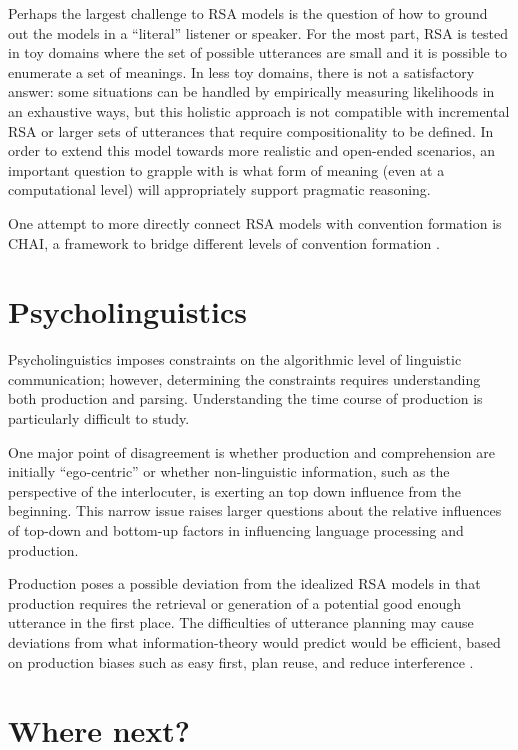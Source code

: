 \documentclass[]{article}
\begin{document}
Perhaps the largest challenge to RSA models is the question of how to ground out the models in a ``literal'' listener or speaker. For the most part, RSA is tested in toy domains where the set of possible utterances are small and it is possible to enumerate a set of meanings. In less toy domains, there is not a satisfactory answer: some situations can be handled by empirically measuring likelihoods in an exhaustive ways, but this holistic approach is not compatible with incremental RSA or larger sets of utterances that require compositionality to be defined. In order to extend this model towards more realistic and open-ended scenarios, an important question to grapple with is what form of meaning (even at a computational level) will appropriately support pragmatic reasoning. 

One attempt to more directly connect RSA models with convention formation is CHAI, a framework to bridge different levels of convention formation \cite{hawkins2021}. 

\section{Psycholinguistics}

Psycholinguistics imposes constraints on the algorithmic level of linguistic communication; however, determining the constraints requires understanding both production and parsing. Understanding the time course of production is particularly difficult to study. 

One major point of disagreement is whether production and comprehension are initially ``ego-centric'' or whether non-linguistic information, such as the perspective of the interlocuter, is exerting an top down influence from the beginning. This narrow issue raises larger questions about the relative influences of top-down and bottom-up factors in influencing language processing and production.

Production poses a possible deviation from the idealized RSA models in that production requires the retrieval or generation of a potential good enough utterance in the first place. The difficulties of utterance planning may cause deviations from what information-theory would predict would be efficient, based on production biases such as easy first, plan reuse, and reduce interference \cite{macdonald2013}. 

\section{Where next?}
\end{document}
